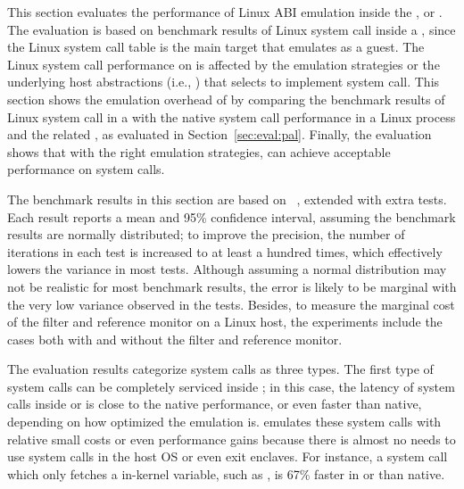 This section evaluates the performance
of Linux ABI emulation
inside the \graphene{} \libos{},
or \thelibos{}.
The evaluation is based on benchmark results
of Linux system call inside a \picoproc{},
since the Linux system call table is the main target that \thelibos{} emulates
as a guest.
The Linux system call performance
on \thelibos{}
is affected by the emulation strategies
or the underlying host abstractions (i.e., \hostapis{})
that \thelibos{}
selects to implement system call.
This section
shows the emulation overhead of \thelibos{}
by comparing the benchmark results
of Linux system call in a \picoproc{} with the native system call performance in a Linux process
and the related \hostapis{}, as evaluated in Section~\ref{sec:eval:pal}.
Finally,
the evaluation shows that with the right emulation strategies,
\thelibos{} can achieve acceptable performance on system calls.


The benchmark results in this section are based on
\lmbenchwithver{}~\cite{McVoy:lmbench},
extended with extra tests.
Each result
reports a mean and 95\% confidence interval,
assuming the benchmark results are normally distributed;
to improve the precision,
the number of iterations in each test is increased to at least a hundred times, which effectively lowers the variance
in most tests.
Although assuming a normal distribution may not be realistic for most benchmark results,
the error is likely to be marginal with the very low variance
observed in the tests.
Besides, to measure the marginal cost of the \seccomp{} filter and reference monitor on a Linux host,
the experiments include the cases both with
and without the \seccomp{} filter and reference monitor.


The evaluation results categorize
system calls as three types.
The first type of system calls can be completely serviced inside \thelibos{};
in this case, the latency of system calls
inside \graphene{} or \graphenesgx{}
is close to the native performance,
or even faster than native,
depending on how optimized the emulation is.
\graphene{} emulates
these system calls with relative small costs or even performance gains
because there is almost no needs
to use system calls in the host OS or even exit enclaves.
For instance,
a system call which only fetches a in-kernel variable, such as ,
is 67\% faster in \graphene{} or \graphenesgx{} than native.



